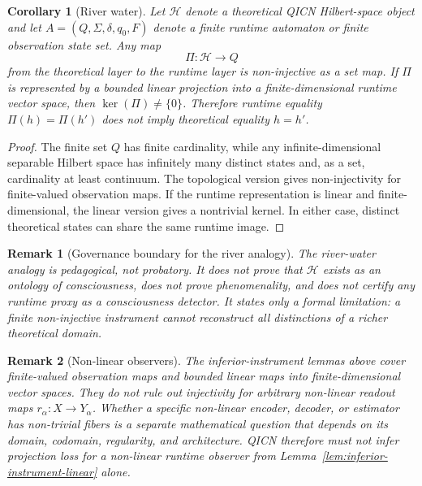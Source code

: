 \documentclass[11pt]{article}
\newtheorem{corollary}{Corollary}
\newtheorem{remark}{Remark}
\begin{document}
\begin{corollary}[River water]\label{cor:river-water}
Let $\mathcal{H}$ denote a theoretical QICN Hilbert-space object and let $A=(Q,\Sigma,\delta,q_0,F)$ denote a finite runtime automaton or finite observation state set. Any map
\[
\Pi\colon\mathcal{H}\to Q
\]
from the theoretical layer to the runtime layer is non-injective as a set map. If $\Pi$ is represented by a bounded linear projection into a finite-dimensional runtime vector space, then $\ker(\Pi)\neq\{0\}$. Therefore runtime equality $\Pi(h)=\Pi(h')$ does not imply theoretical equality $h=h'$.
\end{corollary}

\begin{proof}
The finite set $Q$ has finite cardinality, while any infinite-dimensional separable Hilbert space has infinitely many distinct states and, as a set, cardinality at least continuum. The topological version gives non-injectivity for finite-valued observation maps. If the runtime representation is linear and finite-dimensional, the linear version gives a nontrivial kernel. In either case, distinct theoretical states can share the same runtime image.
\end{proof}

\begin{remark}[Governance boundary for the river analogy]\label{rem:river-governance}
The river-water analogy is pedagogical, not probatory. It does not prove that $\mathcal{H}$ exists as an ontology of consciousness, does not prove phenomenality, and does not certify any runtime proxy as a consciousness detector. It states only a formal limitation: a finite non-injective instrument cannot reconstruct all distinctions of a richer theoretical domain.
\end{remark}

\begin{remark}[Non-linear observers]\label{rem:nonlinear-observers}
The inferior-instrument lemmas above cover finite-valued observation maps and bounded linear maps into finite-dimensional vector spaces. They do not rule out injectivity for arbitrary non-linear readout maps $r_{\alpha}\colon X\to Y_{\alpha}$. Whether a specific non-linear encoder, decoder, or estimator has non-trivial fibers is a separate mathematical question that depends on its domain, codomain, regularity, and architecture. QICN therefore must not infer projection loss for a non-linear runtime observer from Lemma~\ref{lem:inferior-instrument-linear} alone.
\end{remark}
\end{document}
